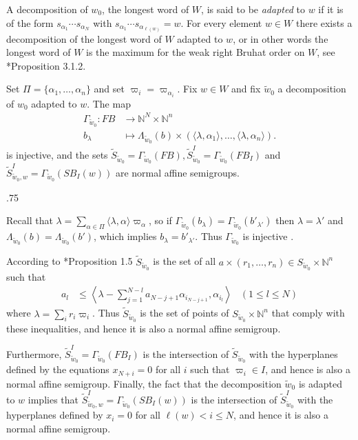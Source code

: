 \documentclass[11pt,fleqn]{article}
\makeatletter
\renewenvironment{proof}[1][\textit{Proof}]{\par
  \pushQED{\qed}%
  \normalfont \topsep.75\paraskip\relax
  \trivlist
  \item[\hskip\labelsep
        \itshape
    #1\@addpunct{.}]\ignorespaces
}{%
  \popQED\endtrivlist\@endpefalse
}
\newcommand\NN{\mathbb N}
\renewcommand\to{\longrightarrow}
\newcommand\GG{\Gamma}
\newcommand\flagbasis{FB}
\newcommand\schubertbasis{SB}
\makeatother
\begin{document}
A decomposition of $w_0$, the longest word of $W$, is said to be \emph{adapted}
to $w$ if it is of the form $s_{\alpha_1} \cdots s_{\alpha_N}$ with 
$s_{\alpha_1} \cdots s_{\alpha_{\ell(w)}} = w$. For every element $w \in W$ 
there exists a decomposition of the longest word of $W$ adapted to $w$, or in 
other words the longest word of $W$ is the maximum for the weak right Bruhat 
order on $W$, see \cite{BB}*{Proposition 3.1.2}. 
\begin{Lemma*}
Set $\Pi = \{\alpha_1, \ldots, \alpha_n\}$ and set $\varpi_i = 
\varpi_{\alpha_i}$. Fix $w \in W$ and fix $\tilde w_0$ a decomposition of 
$w_0$ adapted to $w$. The map
\begin{align*}
\Gamma_{\tilde w_0}:
   FB &\to \NN^{N} \times \NN^n \\
   b_\lambda & \longmapsto \Lambda_{\tilde w_0}(b) \times 
   (\langle \lambda, \alpha_1 \rangle, \ldots, \langle \lambda, \alpha_n 
   \rangle).
\end{align*}
is injective, and the sets $\tilde S_{\tilde w_0} = 
\GG_{\tilde w_0}(\flagbasis), \tilde S_{\tilde w_0}^I = 
\GG_{\tilde w_0}(\flagbasis_I)$ and $\tilde S_{\tilde w_0, w}^I = 
\GG_{\tilde w_0}(\schubertbasis_I(w))$ are normal affine semigroups.
\end{Lemma*}
\begin{proof}
Recall that $\lambda = \sum_{\alpha \in \Pi} \langle \lambda, \alpha \rangle 
\varpi_\alpha$, so if $\Gamma_{\tilde w_0}(b_\lambda) = 
\Gamma_{\tilde w_0}(b'_{\lambda'})$ then $\lambda = \lambda'$ and 
$\Lambda_{\tilde w_0}(b) = \Lambda_{\tilde w_0}(b')$, which implies 
$b_\lambda = b'_{\lambda'}$. Thus $\Gamma_{\tilde w_0}$ is injective .

According to \cite{Lit}*{Proposition 1.5} $
\tilde S_{\tilde w_0}$  is the set of all $a \times (r_1, \ldots, r_n) \in 
S_{\tilde w_0} \times \NN^n$ such that
\begin{align*}
a_l 
  &\leq \left\langle \lambda - \sum_{j=1}^{N-l} a_{N-j+1} \alpha_{i_{N-j+1}}, 
  \alpha_{i_l} \right\rangle
& (1 \leq l \leq N)
\end{align*}
where $\lambda = \sum_i r_i \varpi_i$. Thus $\tilde S_{\tilde w_0}$ is the set 
of points of $S_{\tilde w_0} \times \NN^n$ that comply with these 
inequalities, and hence it is also a normal affine semigroup. 

Furthermore, $\tilde S_{\tilde w_0}^I = \Gamma_{\tilde w_0}(\flagbasis_I)$ is 
the intersection of $\tilde S_{\tilde w_0}$ with the hyperplanes defined by 
the equations $x_{N+i} = 0$ for all $i$ such that $\varpi_i \in I$, and hence 
is also a normal affine semigroup. Finally, the fact that the decomposition 
$\tilde w_0$ is adapted to $w$ implies that 
$\tilde S_{\tilde w_0, w}^I = \Gamma_{\tilde w_0}(\schubertbasis_I(w))$ is the 
intersection of $\tilde S_{\tilde w_0}^I$ with the hyperplanes defined by 
$x_i = 0$ for all $\ell(w) < i \leq N$, and hence it is also a normal affine 
semigroup. 
\end{proof}
\end{document}
